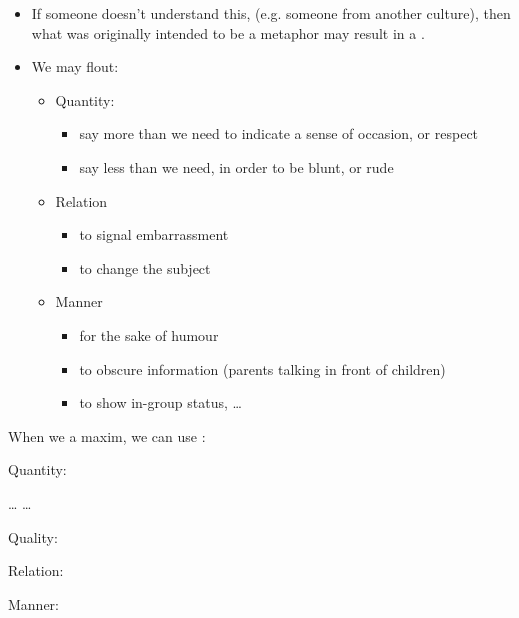 \documentclass[headrule,footrule]{foils}
\begin{document}
\begin{itemize}
\item If someone doesn’t understand this, (e.g. someone from another
  culture), then what was originally intended to be a metaphor may
  result in a .
\item We may flout: 
  \begin{itemize}
\item Quantity: 
  \begin{itemize}
  \item say  more than we need to indicate a sense of occasion, or respect
  \item  say less than we need, in order to be blunt, or rude
  \end{itemize}
\item Relation  
  \begin{itemize}
  \item to signal embarrassment
  \item to change the subject
  \end{itemize}
\item Manner
  \begin{itemize}
  \item for the   sake of humour
  \item to obscure information (parents talking in front of children)
  \item to show in-group status,  \ldots
  \end{itemize}
\end{itemize}
\end{itemize}



When we   a maxim, we can use :

\begin{exe}
\ex Quantity:
    \begin{exe}
    \ex {} \ldots
    \ex {} \ldots
  \end{exe}
\ex Quality:
  \begin{exe}
    \ex {}
    \ex {}
  \end{exe}
\ex Relation:
    \begin{exe}
    \ex {}
  \end{exe}

\ex Manner:
 \begin{exe}
    \ex {}
  \end{exe}
\end{exe}
\end{document}

